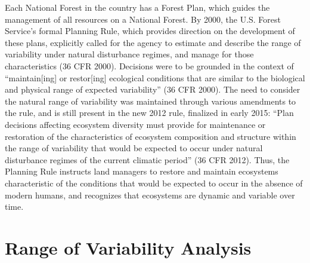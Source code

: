 Each National Forest in the country has a Forest Plan, which guides the management of all resources on a National Forest. By 2000, the U.S. Forest Service's formal Planning Rule, which provides direction on the development of these plans, explicitly called for the agency to estimate and describe the range of variability under natural disturbance regimes, and manage for those characteristics (36 CFR  2000). Decisions were to be grounded in the context of ``maintain[ing] or restor[ing] ecological conditions that are similar to the biological and physical range of expected variability'' (36 CFR  2000). The need to consider the natural range of variability was maintained through various amendments to the rule, and is still present in the new 2012 rule, finalized in early 2015: ``Plan decisions affecting ecosystem diversity must provide for maintenance or restoration of the characteristics of ecosystem composition and structure within the range of variability that would be expected to occur under natural disturbance regimes of the current climatic period'' (36 CFR  2012). Thus, the Planning Rule instructs land managers to restore and maintain ecosystems characteristic of the conditions that would be expected to occur in the absence of modern humans, and recognizes that ecosystems are dynamic and variable over time.





\section{Range of Variability Analysis}

